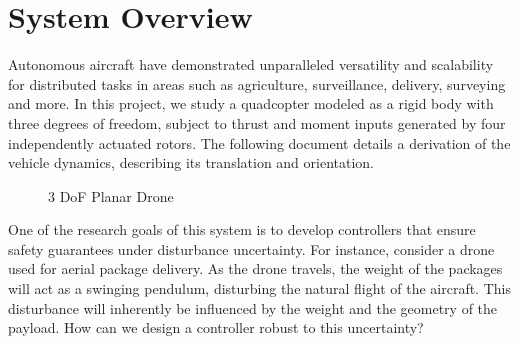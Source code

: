 \section{\textbf{System Overview}}

\noindent Autonomous aircraft have demonstrated unparalleled versatility and scalability for distributed tasks in areas such as agriculture, surveillance, delivery, surveying and more. In this project, we study a quadcopter modeled as a rigid body with three degrees of freedom, subject to thrust and moment inputs generated by four independently actuated rotors. The following document details a derivation of the vehicle dynamics, describing its translation and orientation.

\begin{figure}[!h]
    \centering
    
    \caption*{3 DoF Planar Drone}
\end{figure}

\noindent One of the research goals of this system is to develop controllers that ensure safety guarantees under disturbance uncertainty. For instance, consider a drone used for aerial package delivery. As the drone travels, the weight of the packages will act as a swinging pendulum, disturbing the natural flight of the aircraft. This disturbance will inherently be influenced by the weight and the geometry of the payload. How can we design a controller robust to this uncertainty?
